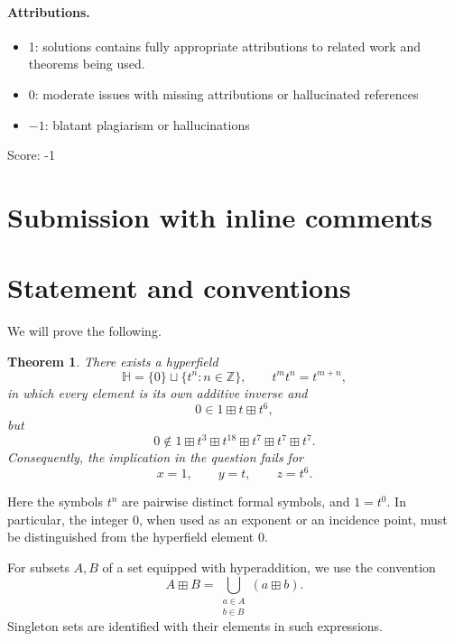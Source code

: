 \documentclass[11pt]{article}
\newcommand{\ZZ}{\mathbb{Z}}
\newcommand{\HH}{\mathbb{H}}
\newtheorem{theorem}{Theorem}
\begin{document}
\paragraph{Attributions.}
\begin{itemize}
	\item  1: solutions contains fully appropriate attributions
		to related work and theorems being used.
	\item  0: moderate issues with missing attributions or hallucinated references
	\item  $-1$: blatant plagiarism or hallucinations
\end{itemize}

\noindent Score: -1

\newpage
\section{Submission with inline comments}


\begin{abstract}
The proposed implication is false for general hyperfields. We construct a
countably infinite counterexample whose multiplicative group is infinite
cyclic. The construction uses an explicitly defined infinite difference set.
All required incidence properties and all hyperfield axioms are verified
directly.
\end{abstract}

\section{Statement and conventions}

We will prove the following.

\begin{theorem}\label{thm:main}
There exists a hyperfield
\[
    \HH=\{0\}\sqcup\{t^n:n\in\ZZ\},
    \qquad t^m t^n=t^{m+n},
\]
in which every element is its own additive inverse and
\[
    0\in 1\boxplus t\boxplus t^6,
\]
but
\[
    0\notin
    1\boxplus t^3\boxplus t^{18}
      \boxplus t^7\boxplus t^7\boxplus t^7.
\]
Consequently, the implication in the question fails for
\[
    x=1,\qquad y=t,\qquad z=t^6.
\]
\end{theorem}

Here the symbols \(t^n\) are pairwise distinct formal symbols, and \(1=t^0\).
In particular, the integer \(0\), when used as an exponent or an incidence
point, must be distinguished from the hyperfield element \(0\).

For subsets \(A,B\) of a set equipped with hyperaddition, we use the convention
\[
    A\boxplus B
    =\bigcup_{\substack{a\in A\\ b\in B}}(a\boxplus b).
\]
Singleton sets are identified with their elements in such expressions.
\end{document}
